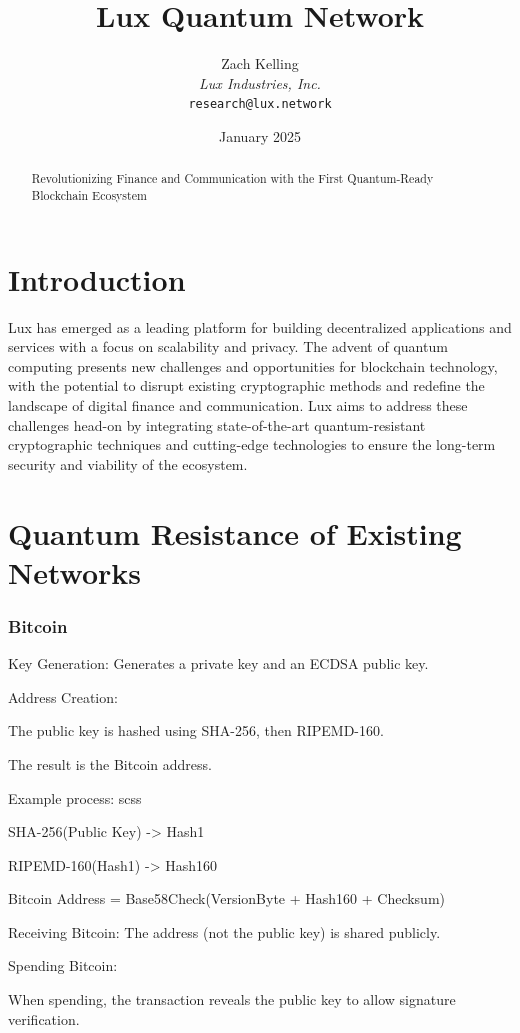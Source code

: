 \documentclass[11pt]{article}
\title{Lux Quantum Network}
\author{Zach Kelling\\\textit{Lux Industries, Inc.}\\\texttt{research@lux.network}}
\date{January 2025}
\begin{document}
\luxcoverpage

\begin{abstract}
Revolutionizing Finance and Communication with the First Quantum-Ready Blockchain Ecosystem
\end{abstract}

\tableofcontents
\newpage


\section{Introduction}

Lux has emerged as a leading platform for building decentralized applications and services with a focus on scalability and privacy. The advent of quantum computing presents new challenges and opportunities for blockchain technology, with the potential to disrupt existing cryptographic methods and redefine the landscape of digital finance and communication. Lux aims to address these challenges head-on by integrating state-of-the-art quantum-resistant cryptographic techniques and cutting-edge technologies to ensure the long-term security and viability of the ecosystem.


\section{Quantum Resistance of Existing Networks}

\subsubsection{Bitcoin}

Key Generation: Generates a private key and an ECDSA public key.


Address Creation:


The public key is hashed using SHA-256, then RIPEMD-160.


The result is the Bitcoin address.


Example process:
scss


SHA-256(Public Key) -> Hash1


RIPEMD-160(Hash1) -> Hash160


Bitcoin Address = Base58Check(VersionByte + Hash160 + Checksum)


Receiving Bitcoin: The address (not the public key) is shared publicly.


Spending Bitcoin:


When spending, the transaction reveals the public key to allow signature verification.
\end{document}
